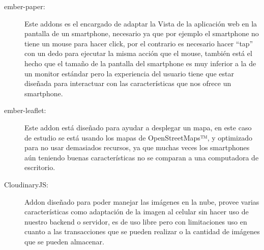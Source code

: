 \begin{description}
\item[ember-paper:] Este addons es el encargado de adaptar la Vista de la aplicación web en la pantalla de un smartphone, necesario ya que por ejemplo el smartphone no tiene un mouse para hacer click, por el contrario es necesario hacer “tap” con un dedo para ejecutar la misma acción que el mouse, también está el hecho que el tamaño de la pantalla del smartphone es muy inferior a la de un monitor estándar pero la experiencia del usuario tiene que estar diseñada para interactuar con las características que nos ofrece un smartphone.

\item[ember-leaflet:] Este addon está diseñado para ayudar a desplegar un mapa, en este caso de estudio se está usando los mapas de OpenStreetMaps™, y optimizado para no usar demasiados recursos, ya que muchas veces los smartphones aún teniendo buenas características no se comparan a una computadora de escritorio.

\item[CloudinaryJS:] Addon diseñado para poder manejar las imágenes en la nube, provee varias características como adaptación de la imagen al celular sin hacer uso de nuestro backend o servidor, es de uso libre pero con limitaciones uso en cuanto a las transacciones que se pueden realizar o la cantidad de imágenes que se pueden almacenar.

\end{description}



